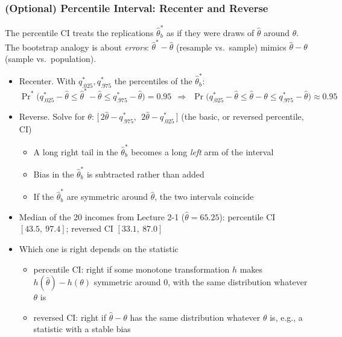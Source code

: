 \documentclass[xcolor=svgnames,9pt,english,aspectratio=169,t]{beamer}
\begin{document}
\begin{frame}
\frametitle{(Optional) Percentile Interval: Recenter and Reverse}
The percentile CI treats the replications $\hat\theta_b^\ast$ as if they were draws of $\hat\theta$ around $\theta$.
The bootstrap analogy is about \emph{errors}: $\hat\theta^\ast-\hat\theta$ (resample vs.\ sample) mimics $\hat\theta-\theta$ (sample vs.\ population).
\begin{itemize}[<+->]
\item \alert{Recenter.} With $q^\ast_{.025}, q^\ast_{.975}$ the percentiles of the $\hat\theta_b^\ast$:
$$
\Pr\nolimits^\ast\big(q^\ast_{.025}-\hat\theta \le \hat\theta^\ast-\hat\theta \le q^\ast_{.975}-\hat\theta\big)=0.95
\ \ \Longrightarrow\ \
\Pr\big(q^\ast_{.025}-\hat\theta \le \hat\theta-\theta \le q^\ast_{.975}-\hat\theta\big)\approx 0.95
$$
\item \alert{Reverse.} Solve for $\theta$: \quad
$\big[\,2\hat\theta-q^\ast_{.975},\ \ 2\hat\theta-q^\ast_{.025}\,\big]$ \quad (the \alert{basic}, or reversed percentile, CI)
\begin{itemize}
\item A long right tail in the $\hat\theta_b^\ast$ becomes a long \emph{left} arm of the interval
\item Bias in the $\hat\theta_b^\ast$ is subtracted rather than added
\item If the $\hat\theta_b^\ast$ are symmetric around $\hat\theta$, the two intervals coincide
\end{itemize}
\item Median of the 20 incomes from Lecture 2-1 ($\hat\theta=65.25$): percentile CI $[43.5,\ 97.4]$; reversed CI $[33.1,\ 87.0]$
\item Which one is right depends on the statistic
\begin{itemize}
\item percentile CI: right if some monotone transformation $h$ makes $h(\hat\theta)-h(\theta)$ symmetric around 0, with the same distribution whatever $\theta$ is
\item reversed CI: right if $\hat\theta-\theta$ has the same distribution whatever $\theta$ is, e.g., a statistic with a stable bias
\end{itemize}
\end{itemize}
\end{frame}
\end{document}
